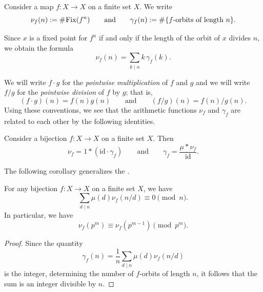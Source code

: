 \begin{definition}
  Consider a map $f:X\to X$ on a finite set $X$. We write
  \begin{equation*}
    \nu_f(n):=\mathord{\#}\mkern1mu \mathrm{Fix}(f^n)
    \qquad\text{and}\qquad
    \gamma_f(n):=\mathord{\#}\mkern1mu \{\text{$f$-orbits of length $n$}\}.
  \end{equation*}
\end{definition}

Since $x$ is a fixed point for $f^n$ if and only if the length of the orbit of $x$ divides $n$, we obtain the formula
\begin{equation}
  \nu_f(n)=\sum_{k\mid n}k\,\gamma_f(k).
\end{equation}

We will write $f\cdot g$ for the \emph{pointwise multiplication} of $f$ and $g$ and we will write $f/g$ for the \emph{pointwise division} of $f$ by $g$; that is,
\begin{equation*}
  (f\cdot g)(n)=f(n)g(n)\qquad\text{and}\qquad (f/g)(n)=f(n)/g(n).
\end{equation*}
Using these conventions, we see that the arithmetic functions $\nu_f$ and $\gamma_f$ are related to each other by the following identities.

\begin{proposition}\label{proposition:fixed-points-orbits}
  Consider a bijection $f:X\to X$ on a finite set $X$. Then
  \begin{equation*}
    \nu_f=1\ast(\mathrm{id}\cdot\gamma_f)\qquad\text{and}\qquad \gamma_f=\frac{\mu\ast \nu_f}{\mathrm{id}}.
  \end{equation*}
\end{proposition}

The following corollary generalizes the .

\begin{corollary}
  For any bijection $f:X\to X$ on a finite set $X$, we have
  \begin{equation*}
    \sum_{d\mid n}\mu(d)\nu_f(n/d) \equiv 0 \pmod{n}.
  \end{equation*}
  In particular, we have
  \begin{equation*}
    \nu_f(p^m)\equiv \nu_f(p^{m-1})\pmod{p^m}.
  \end{equation*}
\end{corollary}

\begin{proof}
  Since the quantity
  \begin{equation*}
    \gamma_f(n)=\frac{1}{n}\sum_{d\mid n}\mu(d)\nu_f(n/d)
  \end{equation*}
  is the integer, determining the number of $f$-orbits of length $n$, it follows that the sum is an integer divisible by $n$.
\end{proof}


